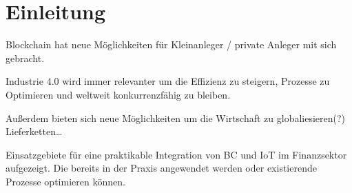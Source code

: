 \section{Einleitung}

Blockchain hat neue Möglichkeiten für Kleinanleger / private Anleger mit sich gebracht.

Industrie 4.0 wird immer relevanter um die Effizienz zu steigern, Prozesse zu Optimieren
und weltweit konkurrenzfähig zu bleiben.

Außerdem bieten sich neue Möglichkeiten um die Wirtschaft zu globaliesieren(?)
Lieferketten\dots 

Einsatzgebiete für eine praktikable Integration von BC und IoT im Finanzsektor aufgezeigt. 
Die bereits in der Praxis angewendet werden oder existierende Prozesse optimieren können.